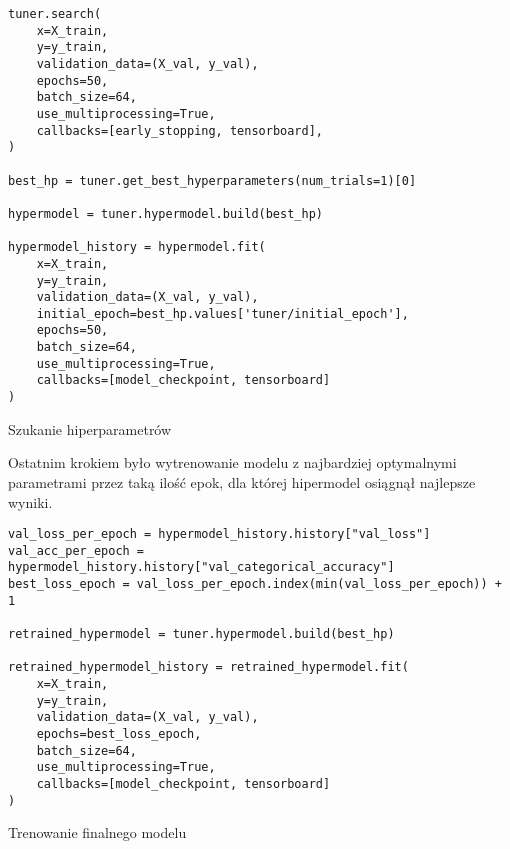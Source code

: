 \begin{listing}[H]
    \color{white}
    \begin{verbatim}
tuner.search(
    x=X_train,
    y=y_train,
    validation_data=(X_val, y_val),
    epochs=50,
    batch_size=64,
    use_multiprocessing=True,
    callbacks=[early_stopping, tensorboard],
)

best_hp = tuner.get_best_hyperparameters(num_trials=1)[0]

hypermodel = tuner.hypermodel.build(best_hp)

hypermodel_history = hypermodel.fit(
    x=X_train,
    y=y_train,
    validation_data=(X_val, y_val),
    initial_epoch=best_hp.values['tuner/initial_epoch'],
    epochs=50,
    batch_size=64,
    use_multiprocessing=True,
    callbacks=[model_checkpoint, tensorboard]
)
    \end{verbatim}
    \caption{Szukanie hiperparametrów}
    \label{lst:hyperparameters-search}
\end{listing}

Ostatnim krokiem było wytrenowanie modelu z najbardziej optymalnymi parametrami przez taką ilość epok, dla której hipermodel osiągnął najlepsze wyniki.

\begin{listing}[H]
    \color{white}
    \begin{verbatim}
val_loss_per_epoch = hypermodel_history.history["val_loss"]
val_acc_per_epoch = hypermodel_history.history["val_categorical_accuracy"]
best_loss_epoch = val_loss_per_epoch.index(min(val_loss_per_epoch)) + 1

retrained_hypermodel = tuner.hypermodel.build(best_hp)

retrained_hypermodel_history = retrained_hypermodel.fit(
    x=X_train,
    y=y_train,
    validation_data=(X_val, y_val),
    epochs=best_loss_epoch,
    batch_size=64,
    use_multiprocessing=True,
    callbacks=[model_checkpoint, tensorboard]
)
    \end{verbatim}
    \caption{Trenowanie finalnego modelu}
    \label{lst:final-training}
\end{listing}
